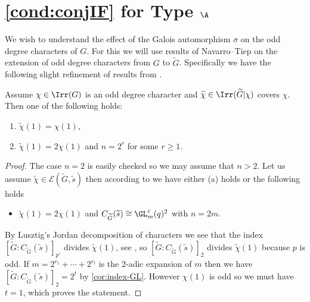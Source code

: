 \documentclass[eqthmnum, nocolour]{jt-calcs}
\begin{document}
\section{\cref{cond:conjIF} for Type $\A$}
\begin{pa}
We wish to understand the effect of the Galois automorphism $\sigma$ on the odd degree characters of $G$. For this we will use results of Navarro--Tiep on the extension of odd degree characters from $G$ to $\widetilde{G}$. Specifically we have the following slight refinement of results from \cite{navarro-tiep:2015:irreducible-representations-of-odd-degree}.
\end{pa}

\begin{lem}\label{prop:extension-to-GLn}
Assume $\chi \in \Irr(G)$ is an odd degree character and $\widetilde{\chi} \in \Irr(\widetilde{G} |\chi)$ covers $\chi$. Then one of the following holds:
\begin{enumerate}
	\item $\widetilde{\chi}(1) = \chi(1)$,

	\item $\widetilde{\chi}(1) = 2\chi(1)$ and $n = 2^r$ for some $r \geqslant 1$.
\end{enumerate}
\end{lem}

\begin{proof}
The case $n=2$ is easily checked so we may assume that $n > 2$. Let us assume $\widetilde{\chi} \in \mathcal{E}(\widetilde{G},\widetilde{s})$ then according to \cite[Lemma 4.5, Lemma 4.6]{navarro-tiep:2015:irreducible-representations-of-odd-degree} we have either (a) holds or the following holds
\begin{itemize}
	\item $\widetilde{\chi}(1) = 2\chi(1)$ and $C_{\widetilde{G}}(\widetilde{s}) \cong \GL_m^{\varepsilon}(q)^2$ with $n = 2m$.
\end{itemize}
By Lusztig's Jordan decomposition of characters we see that the index $[\widetilde{G} : C_{\widetilde{G}}(\widetilde{s})]_{p'}$ divides $\widetilde{\chi}(1)$, see \cite[Remark 13.24]{digne-michel:1991:representations-of-finite-groups-of-lie-type}, so $[\widetilde{G} : C_{\widetilde{G}}(\widetilde{s})]_2$ divides $\widetilde{\chi}(1)$ because $p$ is odd. If $m = 2^{r_1} + \cdots + 2^{r_t}$ is the $2$-adic expansion of $m$ then we have $[\widetilde{G} : C_{\widetilde{G}}(\widetilde{s})]_2 = 2^t$ by \cref{cor:index-GL}. However $\chi(1)$ is odd so we must have $t = 1$, which proves the statement.
\end{proof}
\end{document}
